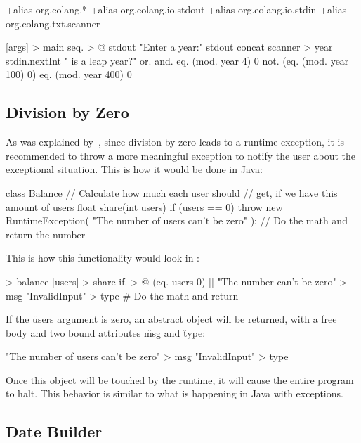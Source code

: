 \begin{eocode}
+alias org.eolang.*
+alias org.eolang.io.stdout
+alias org.eolang.io.stdin
+alias org.eolang.txt.scanner

[args] > main
  seq. > @
    stdout
      "Enter a year:"
    stdout
      concat
        scanner > year
          stdin.nextInt
        " is a leap year?"
        or.
          and.
            eq. (mod. year 4) 0
            not. (eq. (mod. year 100) 0)
          eq. (mod. year 400) 0
\end{eocode}

\subsection{Division by Zero}

As was explained by~\citet[p.314]{eckel2006thinking}, since division by zero
leads to a runtime exception, it is recommended to throw a more meaningful
exception to notify the user about the exceptional situation. This is how
it would be done in Java:

\begin{eocode}
class Balance {
  // Calculate how much each user should
  // get, if we have this amount of users
  float share(int users) {
    if (users == 0) {
      throw new RuntimeException(
        "The number of users can't be zero"
      );
    }
    // Do the math and return the number
  }
}
\end{eocode}

This is how this functionality would look in \eo{}:

\begin{eocode}
[] > balance
  [users] > share
    if. > @
      (eq. users 0)
      []
        "The number can't be zero" > msg
        "InvalidInput" > type
      # Do the math and return
\end{eocode}

If the \f{users} argument is zero, an abstract object
will be returned, with a free body and two bound attributes
\f{msg} and \f{type}:

\begin{eocode}
[]
  "The number of users can't be zero" > msg
  "InvalidInput" > type
\end{eocode}

Once this object will be touched by the runtime, it will cause
the entire program to halt. This behavior is similar to what
is happening in Java with exceptions.

\subsection{Date Builder}


